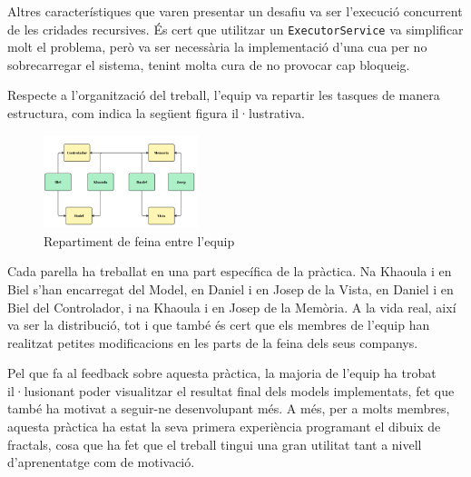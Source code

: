 \documentclass{ieeetj}
\begin{document}
Altres característiques que varen presentar un desafiu va ser l'execució concurrent de les cridades recursives. És cert que utilitzar un \texttt{ExecutorService} va simplificar molt el problema, però va ser necessària la implementació d'una cua per no sobrecarregar el sistema, tenint molta cura de no provocar cap bloqueig.

Respecte a l'organització del treball, l'equip va repartir les tasques de manera estructura, com indica la següent figura il·lustrativa.

\begin{figure}[htbp]
\centerline{\includegraphics[width=0.4\textwidth]{docs/png/Repartiment.jpg}}
\caption{Repartiment de feina entre l'equip}
\label{fig:int2}
\end{figure}

Cada parella ha treballat en una part específica de la pràctica. Na Khaoula i en Biel s'han encarregat del Model, en Daniel i en Josep de la Vista, en Daniel i en Biel del Controlador, i na Khaoula i en Josep de la Memòria. A la vida real, així va ser la distribució, tot i que també és cert que els membres de l'equip han realitzat petites modificacions en les parts de la feina dels seus companys.

Pel que fa al feedback sobre aquesta pràctica, la majoria de l’equip ha trobat il·lusionant poder visualitzar el resultat final dels models implementats, fet que també ha motivat a seguir-ne desenvolupant més. A més, per a molts membres, aquesta pràctica ha estat la seva primera experiència programant el dibuix de fractals, cosa que ha fet que el treball tingui una gran utilitat tant a nivell d’aprenentatge com de motivació.
\end{document}

